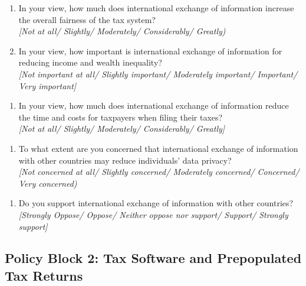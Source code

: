 \documentclass[11pt]{article}
\begin{document}
\begin{enumerate}[resume]
    \item In your view, how much does international exchange of information increase the overall fairness of the tax system?  \\
    \textit{[Not at all/ Slightly/ Moderately/ Considerably/ Greatly)} 
    \item In your view, how important is international exchange of information for reducing income and wealth inequality? \\
    \textit{[Not important at all/ Slightly important/ Moderately important/ Important/ Very important]}
\end{enumerate}
\begin{enumerate}[resume]
    \item In your view, how much does international exchange of information reduce the time and costs for taxpayers when filing their taxes? \\
    \textit{[Not at all/ Slightly/ Moderately/ Considerably/ Greatly]}
\end{enumerate}
\begin{enumerate}[resume]
    \item To what extent are you concerned that international exchange of information with other countries may reduce individuals’ data privacy? \\
    \textit{[Not concerned at all/ Slightly concerned/ Moderately concerned/ Concerned/ Very concerned)}
\end{enumerate}
\begin{enumerate}[resume]
    \item Do you support international exchange of information with other countries? \\
    \textit{[Strongly Oppose/ Oppose/ Neither oppose nor support/ Support/ Strongly support]}
\end{enumerate}

\subsection*{Policy Block 2: Tax Software and Prepopulated Tax Returns}
\end{document}
